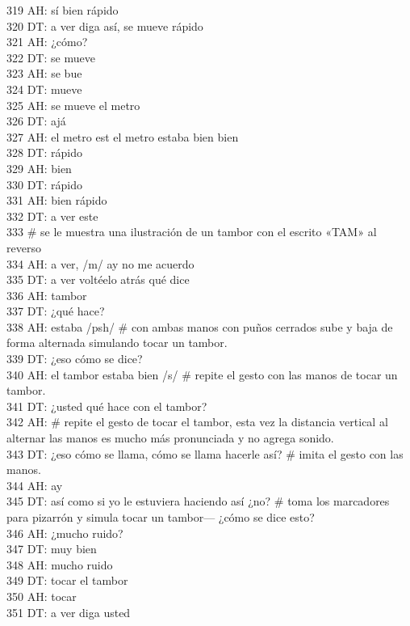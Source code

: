 319 AH: sí bien rápido\\
320 DT: a ver diga así, se mueve rápido\\
321 AH: ¿cómo?\\
322 DT: se mueve\\
323 AH: se bue\\
324 DT: mueve\\
325 AH: se mueve el metro\\
326 DT: ajá\\
327 AH: el metro est el metro estaba bien bien \\
328 DT: rápido\\
329 AH: bien\\
330 DT: rápido\\
331 AH: bien rápido\\
332 DT: a ver este\\
333 \# se le muestra una ilustración de un tambor con el escrito «TAM» al reverso\\
334 AH: a ver, /m/ ay no me acuerdo\\
335 DT: a ver voltéelo atrás qué dice\\
336 AH: tambor\\
337 DT: ¿qué hace?\\
338 AH: estaba /psh/ \# con ambas manos con puños cerrados sube y baja de forma alternada simulando tocar un tambor. \\
339 DT: ¿eso cómo se dice?\\
340 AH: el tambor estaba bien /s/ \# repite el gesto con las manos de tocar un tambor.\\
341 DT: ¿usted qué hace con el tambor?\\
342 AH: \# repite el gesto de tocar el tambor, esta vez la distancia vertical al alternar las manos es mucho más pronunciada y no agrega sonido.\\
343 DT: ¿eso cómo se llama, cómo se llama hacerle así? \# imita el gesto con las manos.\\
344 AH: ay\\
345 DT: así como si yo le estuviera haciendo así ¿no? \# toma los marcadores para pizarrón y simula tocar un tambor--- ¿cómo se dice esto?\\
346 AH: ¿mucho ruido?\\
347 DT: muy bien\\
348 AH: mucho ruido\\
349 DT: tocar el tambor\\
350 AH: tocar\\
351 DT: a ver diga usted\\
